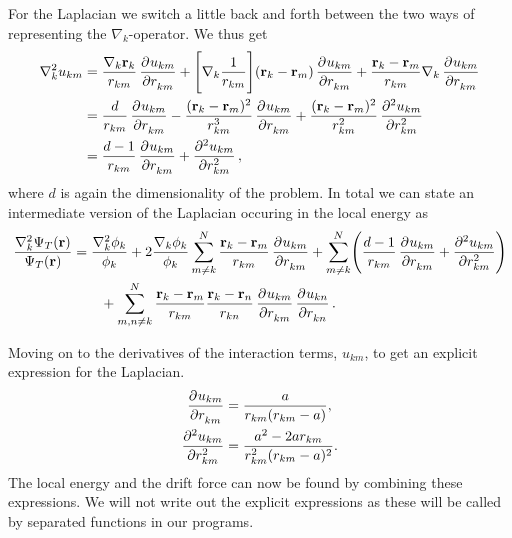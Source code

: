 \documentclass[
    a4paper, aps, twocolumn, floatfix, superscriptaddress,
    nofootinbib]{revtex4-1}
\newcommand{\vf}{\mathbf}
\newcommand{\1}{\mathds{1}}
\begin{document}
    \begin{widetext}
        For the Laplacian we switch a little back and forth between the
        two ways of representing the $\nabla_k$-operator. We thus get
        \begin{align}
            \nabla_k^2 u_{km}
            &=
            \frac{\nabla_k \vf{r}_k}{r_{km}}\dpd[]{u_{km}}{r_{km}}
            + \Biggl[
                \nabla_k \frac{1}{r_{km}}
            \Biggr]
            (\vf{r}_k - \vf{r}_m)\dpd[]{u_{km}}{r_{km}}
            + \frac{\vf{r}_k - \vf{r}_m}{r_{km}}
            \nabla_k \dpd[]{u_{km}}{r_{km}} \\
            &= \frac{d}{r_{km}}\dpd[]{u_{km}}{r_{km}}
            - \frac{(\vf{r}_k - \vf{r}_m)^2}{r_{km}^3}
            \dpd[]{u_{km}}{r_{km}}
            + \frac{(\vf{r}_k - \vf{r}_m)^2}{r_{km}^2}
            \dpd[2]{u_{km}}{r_{km}} \\
            &=
            \frac{d - 1}{r_{km}}\dpd[]{u_{km}}{r_{km}}
            + \dpd[2]{u_{km}}{r_{km}},
        \end{align}
        where $d$ is again the dimensionality of the problem. In total
        we can state an intermediate version of the Laplacian occuring
        in the local energy as
        \begin{align}
            \frac{\nabla_k^2\Psi_T(\vf{r})}{\Psi_T(\vf{r})}
            &=
            \frac{\nabla_k^2\phi_k}{\phi_k}
            + 2\frac{\nabla_k\phi_k}{\phi_k}
            \sum_{m \neq k}^N
            \frac{\vf{r}_k - \vf{r}_m}{r_{km}}
            \dpd[]{u_{km}}{r_{km}}
            + \sum_{m\neq k}^N
            \Biggl(
                \frac{d - 1}{r_{km}}\dpd[]{u_{km}}{r_{km}}
                + \dpd[2]{u_{km}}{r_{km}}
            \Biggr)
            \nonumber \\
            &\qquad
            +
            \sum_{m, n \neq k}^N
            \frac{\vf{r}_k - \vf{r}_m}{r_{km}}
            \frac{\vf{r}_k - \vf{r}_n}{r_{kn}}
            \dpd[]{u_{km}}{r_{km}}
            \dpd[]{u_{kn}}{r_{kn}}.
        \end{align}
    \end{widetext}
    Moving on to the derivatives of the interaction terms, $u_{km}$, to
    get an explicit expression for the Laplacian.
    \begin{align}
        \dpd[]{u_{km}}{r_{km}}
        &=
        \frac{a}{r_{km}(r_{km} - a)},
        \\
        \dpd[2]{u_{km}}{r_{km}}
        &= \frac{a^2 - 2ar_{km}}{r_{km}^2(r_{km} - a)^2}.
    \end{align}
    The local energy and the drift force can now be found by combining these
    expressions. We will not write out the explicit expressions as
    these will be called by separated functions in our programs.
\end{document}
